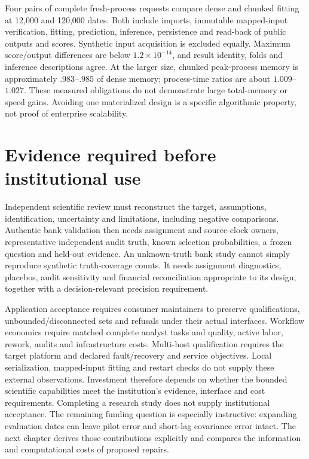 Four pairs of complete fresh-process requests compare dense and chunked fitting
at 12,000 and 120,000 dates. Both include imports, immutable mapped-input
verification, fitting, prediction, inference, persistence and read-back of
public outputs and scores. Synthetic input acquisition is excluded equally.
Maximum score/output differences are below $1.2\times10^{-14}$, and result
identity, folds and inference descriptions agree. At the larger size, chunked
peak-process memory is approximately $.983$--$.985$ of dense memory; process-time
ratios are about $1.009$--$1.027$. These measured obligations do not demonstrate
large total-memory or speed gains. Avoiding one materialized design is a
specific algorithmic property, not proof of enterprise scalability.

\section{Evidence required before institutional use}
\label{r8:external}

Independent scientific review must reconstruct the target, assumptions,
identification, uncertainty and limitations, including negative comparisons.
Authentic bank validation then needs assignment and source-clock owners,
representative independent audit truth, known selection probabilities, a frozen
question and held-out evidence. An unknown-truth bank study cannot simply
reproduce synthetic truth-coverage counts. It needs assignment diagnostics,
placebos, audit sensitivity and financial reconciliation appropriate to its
design, together with a decision-relevant precision requirement.

Application acceptance requires consumer maintainers to preserve qualifications,
unbounded/disconnected sets and refusals under their actual interfaces. Workflow
economics require matched complete analyst tasks and quality, active labor,
rework, audits and infrastructure costs. Multi-host qualification requires the
target platform and declared fault/recovery and service objectives. Local
serialization, mapped-input fitting and restart checks do not supply these
external observations. Investment therefore depends on whether the bounded
scientific capabilities meet the institution's evidence, interface and cost
requirements. Completing a research study does not supply institutional
acceptance. The remaining funding question is especially instructive: expanding evaluation dates can leave pilot error and short-lag covariance error intact. The next chapter derives those contributions explicitly and compares the information and computational costs of proposed repairs.

